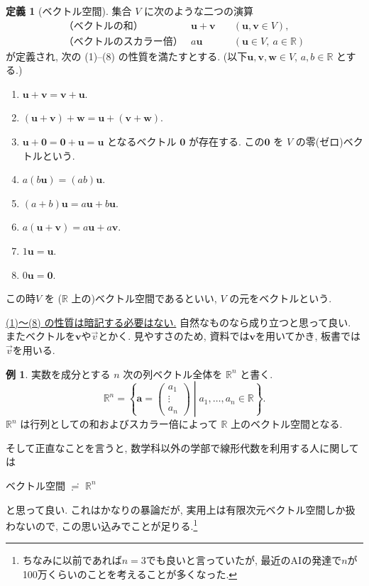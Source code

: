 \documentclass[dvipdfmx,a4paper,11pt]{article} %
\newcommand{\R}{\mathbb{R}}
\theoremstyle{definition}
\newtheorem{defn}[thm]{定義}
\newtheorem{ex}[thm]{例}
\begin{document}
\begin{defn}[ベクトル空間]
集合 $V$ に次のような二つの演算
\[
\begin{array}{lll}
\text{（ベクトルの和）}&\bm{u}+\bm{v}&\quad (\bm{u},\bm{v}\in V),\\
\text{（ベクトルのスカラー倍）}&a\bm{u}&\quad (\bm{u}\in V,\ a\in\mathbb{R})
\end{array}
\]
が定義され, 次の (1)--(8) の性質を満たすとする. 
(以下$\bm{u},\bm{v},\bm{w}\in V$, $a,b\in\mathbb{R}$ とする.)
\begin{enumerate}
\item $\bm{u}+\bm{v}=\bm{v}+\bm{u}$.
\item $(\bm{u}+\bm{v})+\bm{w}=\bm{u}+(\bm{v}+\bm{w})$.
\item $\bm{u}+\bm{0}=\bm{0}+\bm{u}=\bm{u}$ となるベクトル $\bm{0}$ が存在する. この$\bm{0}$ を $V$ の零(ゼロ)ベクトルという.
\item $a(b\bm{u})=(ab)\bm{u}$.
\item $(a+b)\bm{u}=a\bm{u}+b\bm{u}$.
\item $a(\bm{u}+\bm{v})=a\bm{u}+a\bm{v}$.
\item $1\bm{u}=\bm{u}$.
\item $0\bm{u}=\bm{0}$.
\end{enumerate}
この時$V$ を ($\mathbb{R}$ 上の)ベクトル空間であるといい, $V$ の元をベクトルという.
\end{defn}

\underline{(1)～(8) の性質は暗記する必要はない.}
自然なものなら成り立つと思って良い. 
またベクトルを$\bm{v}$や$\overset{\rightarrow}{v}$とかく. 
見やすさのため, 資料では$\bm{v}$を用いてかき, 板書では$\overset{\rightarrow}{v}$を用いる. 

\begin{ex}
実数を成分とする $n$ 次の列ベクトル全体を $\mathbb{R}^n$ と書く. 
\[
\mathbb{R}^n
=
\left\{
\bm{a}=
\begin{pmatrix}
a_1\\
\vdots\\
a_n
\end{pmatrix}
\mathrel{}\middle|\mathrel{}
a_1,\ldots,a_n\in\mathbb{R}
\right\}.
\]
$\mathbb{R}^n$ は行列としての和およびスカラー倍によって $\mathbb{R}$ 上のベクトル空間となる.

そして正直なことを言うと, 数学科以外の学部で線形代数を利用する人に関しては
\begin{tcolorbox}[mybox]
\begin{center}
ベクトル空間 $\risingdotseq$ $\R^n$
\end{center}
\end{tcolorbox}
と思って良い.
これはかなりの暴論だが, 実用上は有限次元ベクトル空間しか扱わないので, この思い込みでことが足りる.\footnote{ちなみに以前であれば$n=3$でも良いと言っていたが, 最近のAIの発達で$n$が100万くらいのことを考えることが多くなった.}
\end{ex}
\end{document}

